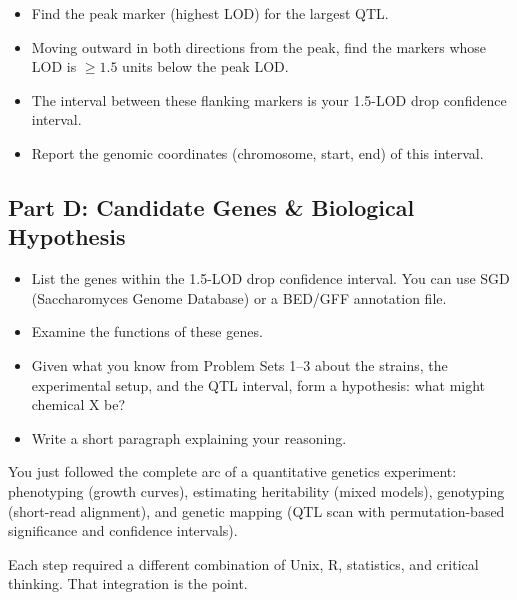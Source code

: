 \begin{dobox}[Tasks]
\begin{itemize}[nosep]
  \item Find the peak marker (highest LOD) for the largest QTL.
  \item Moving outward in both directions from the peak, find the markers whose LOD is $\geq 1.5$ units below the peak LOD.
  \item The interval between these flanking markers is your 1.5-LOD drop confidence interval.
  \item Report the genomic coordinates (chromosome, start, end) of this interval.
\end{itemize}
\end{dobox}

\subsection{Part D: Candidate Genes \& Biological Hypothesis}

\begin{dobox}[Tasks]
\begin{itemize}[nosep]
  \item List the genes within the 1.5-LOD drop confidence interval. You can use SGD (Saccharomyces Genome Database) or a BED/GFF annotation file.
  \item Examine the functions of these genes.
  \item Given what you know from Problem Sets 1--3 about the strains, the experimental setup, and the QTL interval, form a hypothesis: what might chemical X be?
  \item Write a short paragraph explaining your reasoning.
\end{itemize}
\end{dobox}

\begin{brainbox}
You just followed the complete arc of a quantitative genetics experiment: phenotyping (growth curves), estimating heritability (mixed models), genotyping (short-read alignment), and genetic mapping (QTL scan with permutation-based significance and confidence intervals).

Each step required a different combination of Unix, R, statistics, and critical thinking. That integration is the point.
\end{brainbox}
